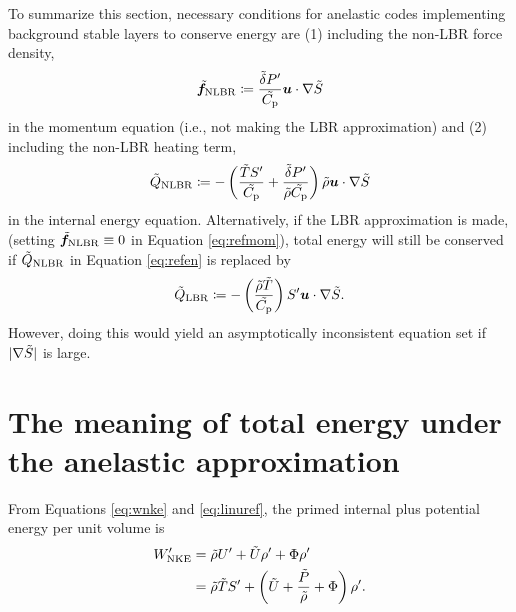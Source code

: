 \documentclass[12pt]{article}
\newcommand{\wpnke}{W^\prime_{\rm NKE}}
\newcommand{\wpheat}{W^\prime_{\rm heat}}
\newcommand{\wpcomp}{W^\prime_{\rm comp}}
\begin{document}
To summarize this section, necessary conditions for anelastic codes implementing background stable layers to conserve energy are (1) including the non-LBR force density,
\begin{align}\label{eq:nlbrmomref}
	\tilde{\bm{f}}_{\rm NLBR} \coloneqq\frac{\tilde{\delta}  {P^\prime}}{\tilde{C_{\rm{p}}}} \bm{u}\cdot \nabla\tilde{S} 
\end{align}
in the momentum equation (i.e., not making the LBR approximation) and (2) including the non-LBR heating term,
\begin{align}\label{eq:nlbrheatref}
	\tilde{Q}_{\rm NLBR} \coloneqq -  \left(\frac{\tilde{T} {S^\prime}}{\tilde{C_{\rm{p}}}} + \frac{\tilde{\delta}  {P^\prime}}{\tilde{\rho}\tilde{C_{\rm{p}}}}\right)  \tilde{\rho} \bm{u}\cdot\nabla\tilde{S}
\end{align}
in the internal energy equation. Alternatively, if the LBR approximation is made, (setting $\tilde{\bm{f}}_{\rm NLBR}\equiv0$ in Equation \eqref{eq:refmom}), total energy will still be conserved if $\tilde{Q}_{\rm NLBR}$ in Equation \eqref{eq:refen} is replaced by
\begin{align}\label{eq:lbrheating}
	\tilde{Q}_{\rm LBR}\coloneqq - \left(\frac{\tilde{\rho}\tilde{T}}{\tilde{C_{\rm{p}}}} \right) {S^\prime}\bm{u}\cdot\nabla\tilde{S}.
\end{align}
However, doing this would yield an asymptotically inconsistent equation set if $|\nabla\tilde{S}|$ is large. 


\section{The meaning of total energy under the anelastic approximation}\label{sec:meaningtote}
From Equations \eqref{eq:wnke} and \eqref{eq:linuref}, the primed internal plus potential energy per unit volume is 
\begin{align}\label{eq:wp1}
	\wpnke &=  \rhotilde U^\prime + \tilde{U}\rhoprime + \Phi \rhoprime \nonumber\\
	&= \rhotilde\tmptilde \entrprime + \left(\tilde{U}+\frac{\tilde{P}}{\rhotilde}+\Phi\right)\rhoprime.
\end{align}
\end{document}
